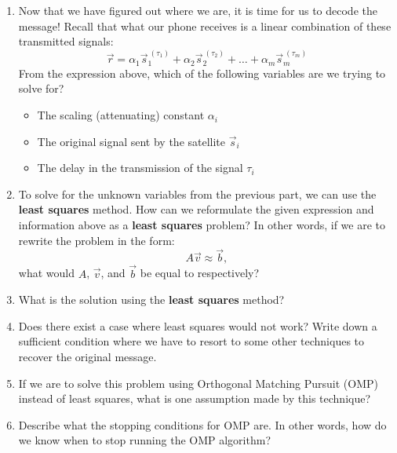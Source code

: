\begin{enumerate}
    \answerbox{4cm}

    \item Now that we have figured out where we are, it is time for us to decode the message! Recall that what our phone receives is a linear combination of these transmitted signals:
    $$\vec{r} = \alpha_1 \vec{s}_1^{\ (\tau_1)} + \alpha_2 \vec{s}_2^{\ (\tau_2)} + \hdots + \alpha_m \vec{s}_m^{\ (\tau_m)}$$
    From the expression above, which of the following variables are we trying to solve for?
    \begin{itemize}
        \item The scaling (attenuating) constant $\alpha_i$
        \item The original signal sent by the satellite $\vec{s}_i$
        \item The delay in the transmission of the signal $\tau_i$
    \end{itemize}

    \answerbox{3cm}

    \item To solve for the unknown variables from the previous part, we can use the \textbf{least squares} method. How can we reformulate the given expression and information above as a \textbf{least squares} problem? In other words, if we are to rewrite the problem in the form:
    $$A\vec{v} \approx \vec{b},$$
    what would $A$, $\vec{v}$, and $\vec{b}$ be equal to respectively?
    
    \answerbox{4cm}

    \item What is the solution using the \textbf{least squares} method?
    
    \answerbox{3cm}

    \item Does there exist a case where least squares would not work? Write down a sufficient condition where we have to resort to some other techniques to recover the original message.

    \answerbox{3cm}

    \item If we are to solve this problem using Orthogonal Matching Pursuit (OMP) instead of least squares, what is one assumption made by this technique?

    \answerbox{2cm}

    \item Describe what the stopping conditions for OMP are. In other words, how do we know when to stop running the OMP algorithm?

    \answerbox{2cm}

\end{enumerate}